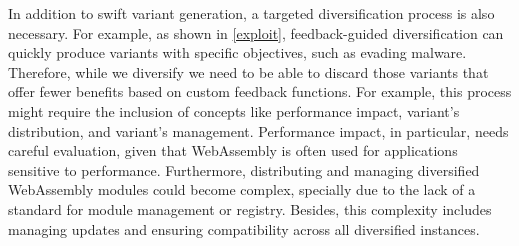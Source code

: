 In addition to swift variant generation, a targeted diversification process is also necessary. 
For example, as shown in \autoref{exploit}, feedback-guided diversification can quickly produce variants with specific objectives, such as evading malware. 
Therefore, while we diversify we need to be able to discard those variants that offer fewer benefits based on custom feedback functions.
For example, this process might require the inclusion of concepts like performance impact, variant's distribution, and variant's management. 
Performance impact, in particular, needs careful evaluation, given that WebAssembly is often used for applications sensitive to performance. 
Furthermore, distributing and managing diversified WebAssembly modules could become complex, specially due to the lack of a standard for \Wasm module management or registry.
Besides, this complexity includes managing updates and ensuring compatibility across all diversified instances.




